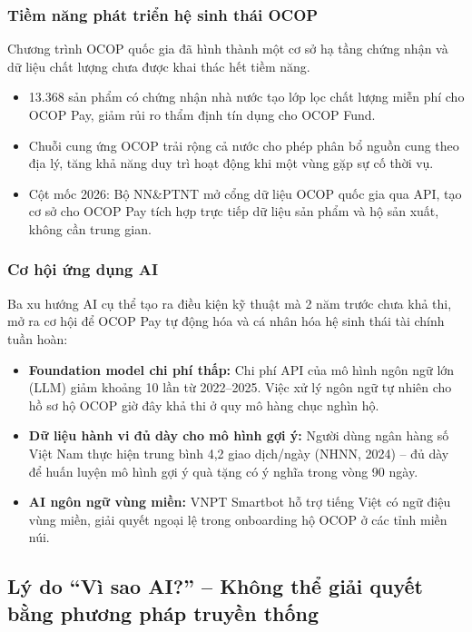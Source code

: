 \documentclass[13pt,a4paper]{extarticle}
\begin{document}
\subsubsection{Tiềm năng phát triển hệ sinh thái OCOP}

Chương trình OCOP quốc gia đã hình thành một cơ sở hạ tầng chứng nhận và dữ liệu chất lượng chưa được khai thác hết tiềm năng.

\begin{itemize}
    \item 13.368 sản phẩm có chứng nhận nhà nước tạo lớp lọc chất lượng miễn phí cho OCOP Pay, giảm rủi ro thẩm định tín dụng cho OCOP Fund.
    \item Chuỗi cung ứng OCOP trải rộng cả nước cho phép phân bổ nguồn cung theo địa lý, tăng khả năng duy trì hoạt động khi một vùng gặp sự cố thời vụ.
    \item Cột mốc 2026: Bộ NN\&PTNT mở cổng dữ liệu OCOP quốc gia qua API, tạo cơ sở cho OCOP Pay tích hợp trực tiếp dữ liệu sản phẩm và hộ sản xuất, không cần trung gian.
\end{itemize}

\subsubsection{Cơ hội ứng dụng AI}

Ba xu hướng AI cụ thể tạo ra điều kiện kỹ thuật mà 2 năm trước chưa khả thi, mở ra cơ hội để OCOP Pay tự động hóa và cá nhân hóa hệ sinh thái tài chính tuần hoàn:

\begin{itemize}
    \item \textbf{Foundation model chi phí thấp:} Chi phí API của mô hình ngôn ngữ lớn (LLM) giảm khoảng 10 lần từ 2022--2025. Việc xử lý ngôn ngữ tự nhiên cho hồ sơ hộ OCOP giờ đây khả thi ở quy mô hàng chục nghìn hộ.
    \item \textbf{Dữ liệu hành vi đủ dày cho mô hình gợi ý:} Người dùng ngân hàng số Việt Nam thực hiện trung bình 4,2 giao dịch/ngày (NHNN, 2024) -- đủ dày để huấn luyện mô hình gợi ý quà tặng có ý nghĩa trong vòng 90 ngày.
    \item \textbf{AI ngôn ngữ vùng miền:} VNPT Smartbot hỗ trợ tiếng Việt có ngữ điệu vùng miền, giải quyết ngoại lệ trong onboarding hộ OCOP ở các tỉnh miền núi.
\end{itemize}

\subsection{Lý do ``Vì sao AI?'' -- Không thể giải quyết bằng phương pháp truyền thống}
\end{document}
